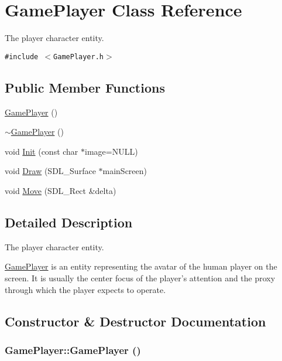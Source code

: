 \hypertarget{class_game_player}{
\section{GamePlayer Class Reference}
\label{d7/df6/class_game_player}
}
The player character entity.  


{\tt \#include $<$GamePlayer.h$>$}

\subsection*{Public Member Functions}
\begin{CompactItemize}
\item 
\hyperlink{class_game_player_f0314668e232831d2f9c263596dccde6}{GamePlayer} ()
\item 
\hyperlink{class_game_player_ad6c1016873c9e4750ce370552541745}{$\sim$GamePlayer} ()
\item 
void \hyperlink{class_game_player_937dcf8e5b90200f5ae0a3418adf7271}{Init} (const char $\ast$image=NULL)
\item 
void \hyperlink{class_game_player_3e5c897e5120b5297e7226a4cb143742}{Draw} (SDL\_\-Surface $\ast$mainScreen)
\item 
void \hyperlink{class_game_player_df2b0a348192c421edcc94b3ca1cc3d6}{Move} (SDL\_\-Rect \&delta)
\end{CompactItemize}


\subsection{Detailed Description}
The player character entity. 

\hyperlink{class_game_player}{GamePlayer} is an entity representing the avatar of the human player on the screen. It is usually the center focus of the player's attention and the proxy through which the player expects to operate. 

\subsection{Constructor \& Destructor Documentation}
\hypertarget{class_game_player_f0314668e232831d2f9c263596dccde6}{
\subsubsection[{GamePlayer}]{\setlength{\rightskip}{0pt plus 5cm}GamePlayer::GamePlayer ()}}
\label{d7/df6/class_game_player_f0314668e232831d2f9c263596dccde6}



